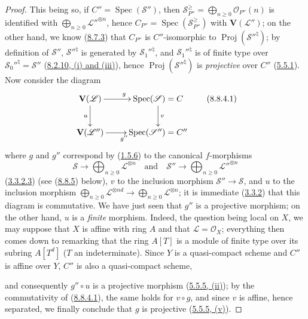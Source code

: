 \begin{proof}
This being so, if $C''=\operatorname{Spec}(\mathcal{S}'')$, then
$\mathcal{S}_{P''}^{\geqslant}=
\bigoplus_{n\geqslant 0}\mathcal{O}_{P''}(n)$ is identified with
$\bigoplus_{n\geqslant 0}\mathcal{L}''^{\otimes n}$, hence
$C_{P''}=\operatorname{Spec}(\mathcal{S}_{P''}^{\geqslant})$ with
$\mathbf{V}(\mathcal{L}'')$; on the other hand, we know
(\hyperref[II.8.7.3]{8.7.3}) that $C_{P''}$ is $C''$-isomorphic to
$\operatorname{Proj}(\mathcal{S}''^{\natural})$; by definition of
$\mathcal{S}''$, $\mathcal{S}''^{\natural}$ is generated by
$\mathcal{S}_1''^{\natural}$, and $\mathcal{S}_1''^{\natural}$ is of finite type
over $\mathcal{S}_0''^{\natural}=\mathcal{S}''$
(\hyperref[II.8.2.10]{8.2.10, (i) and (iii)}), hence
$\operatorname{Proj}(\mathcal{S}''^{\natural})$ is \emph{projective} over
$C''$ (\hyperref[II.5.5.1]{5.5.1}). Now consider the diagram
\begin{equation}
\label{II.8.8.4.1}
  \xymatrix{
    \mathbf{V}(\mathcal{L})\ar[r]^{g}\ar[d]_{u} &
    \operatorname{Spec}(\mathcal{S})=C\ar[d]^{v}\\
    \mathbf{V}(\mathcal{L}'')\ar[r]_{g''} &
    \operatorname{Spec}(\mathcal{S}'')=C''
  }
\tag{8.8.4.1}
\end{equation}
where $g$ and $g''$ correspond by (\hyperref[II.1.5.6]{1.5.6}) to the
canonical $f$-morphisms
\[
  \mathcal{S}\longrightarrow
  \bigoplus_{n\geqslant 0}\mathcal{L}^{\otimes n}
  \quad\text{and}\quad
  \mathcal{S}''\longrightarrow
  \bigoplus_{n\geqslant 0}\mathcal{L}''^{\otimes n}
\]
(\hyperref[II.3.3.2.3]{3.3.2.3}) (see
(\hyperref[II.8.8.5]{8.8.5}) below), $v$ to the inclusion morphism
$\mathcal{S}''\to\mathcal{S}$, and $u$ to the inclusion morphism
$\bigoplus_{n\geqslant 0}\mathcal{L}^{\otimes nd}\to
\bigoplus_{n\geqslant 0}\mathcal{L}^{\otimes n}$; it is immediate
(\hyperref[II.3.3.2]{3.3.2}) that this diagram is commutative. We have
just seen that $g''$ is a projective morphism; on the other hand, $u$ is a
\emph{finite} morphism. Indeed, the question being local on $X$, we may
suppose that $X$ is affine with ring $A$ and that $\mathcal{L}=\mathcal{O}_X$;
everything then comes down to remarking that the ring $A[T]$ is a module of
finite type over its subring $A[T^d]$ ($T$ an indeterminate). Since $Y$ is a
quasi-compact scheme and $C''$ is affine over $Y$, $C''$ is also a
quasi-compact scheme,

and consequently $g''\circ u$ is a projective morphism
(\hyperref[II.5.5.5]{5.5.5, (ii)}); by the commutativity of
(\hyperref[II.8.8.4.1]{8.8.4.1}), the same holds for $v\circ g$, and since
$v$ is affine, hence separated, we finally conclude that $g$ is projective
(\hyperref[II.5.5.5]{5.5.5, (v)}).
\end{proof}

